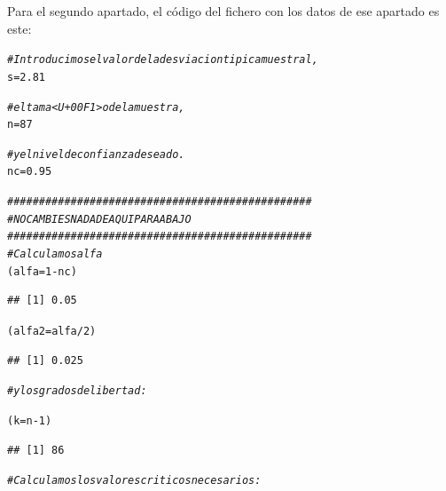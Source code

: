 \documentclass[10pt,a4paper]{article}\usepackage[]{graphicx}\usepackage[]{color}
\makeatletter
\newcommand{\hlnum}[1]{\textcolor[rgb]{0.686,0.059,0.569}{#1}}%
\newcommand{\hlcom}[1]{\textcolor[rgb]{0.678,0.584,0.686}{\textit{#1}}}%
\newcommand{\hlopt}[1]{\textcolor[rgb]{0,0,0}{#1}}%
\newcommand{\hlstd}[1]{\textcolor[rgb]{0.345,0.345,0.345}{#1}}%
\newcommand{\hlkwb}[1]{\textcolor[rgb]{0.69,0.353,0.396}{#1}}%
\newenvironment{kframe}{%
 \def\at@end@of@kframe{}%
 \ifinner\ifhmode%
  \def\at@end@of@kframe{\end{minipage}}%
  \begin{minipage}{\columnwidth}%
 \fi\fi%
 \def\FrameCommand##1{\hskip\@totalleftmargin \hskip-\fboxsep
 \colorbox{shadecolor}{##1}\hskip-\fboxsep
     \hskip-\linewidth \hskip-\@totalleftmargin \hskip\columnwidth}%
 \MakeFramed {\advance\hsize-\width
   \@totalleftmargin\z@ \linewidth\hsize
   \@setminipage}}%
 {\par\unskip\endMakeFramed%
 \at@end@of@kframe}
\newenvironment{knitrout}{}{} %
\makeatother
\begin{document}
Para el segundo apartado, el código del fichero con los datos de ese apartado es este:
\begin{knitrout}
\color{fgcolor}\begin{kframe}
\begin{alltt}
\hlcom{# Introducimos el valor de la desviacion tipica muestral,}
\hlstd{s} \hlkwb{=} \hlnum{2.81}

\hlcom{# el tama<U+00F1>o de la muestra,}
\hlstd{n} \hlkwb{=} \hlnum{87}

\hlcom{# y el nivel de confianza deseado.}
\hlstd{nc} \hlkwb{=} \hlnum{0.95}

\hlcom{################################################}
\hlcom{#NO CAMBIES NADA DE AQUI PARA ABAJO}
\hlcom{################################################}
\hlcom{# Calculamos alfa}
\hlstd{(alfa} \hlkwb{=} \hlnum{1} \hlopt{-} \hlstd{nc)}
\end{alltt}
\begin{verbatim}
## [1] 0.05
\end{verbatim}
\begin{alltt}
\hlstd{(alfa2} \hlkwb{=} \hlstd{alfa} \hlopt{/} \hlnum{2}\hlstd{)}
\end{alltt}
\begin{verbatim}
## [1] 0.025
\end{verbatim}
\begin{alltt}
\hlcom{# y los grados de libertad:}

\hlstd{(k}\hlkwb{=} \hlstd{n} \hlopt{-} \hlnum{1}\hlstd{)}
\end{alltt}
\begin{verbatim}
## [1] 86
\end{verbatim}
\begin{alltt}
\hlcom{# Calculamos los valores criticos necesarios:}


\end{alltt}
\end{kframe}
\end{knitrout}
\end{document}
